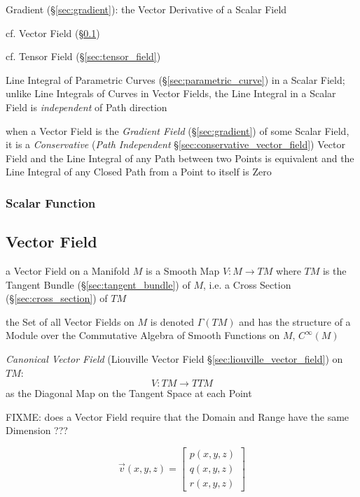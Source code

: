 Gradient (\S\ref{sec:gradient}): the Vector Derivative of a Scalar Field

cf. Vector Field (\S\ref{sec:vector_field})

cf. Tensor Field (\S\ref{sec:tensor_field})

Line Integral of Parametric Curves (\S\ref{sec:parametric_curve}) in a Scalar
Field; unlike Line Integrals of Curves in Vector Fields, the Line Integral in a
Scalar Field is \emph{independent} of Path direction

when a Vector Field is the \emph{Gradient Field} (\S\ref{sec:gradient}) of some
Scalar Field, it is a \emph{Conservative} (\emph{Path Independent}
\S\ref{sec:conservative_vector_field}) Vector Field and the Line Integral of
any Path between two Points is equivalent and the Line Integral of any Closed
Path from a Point to itself is Zero



\subsubsection{Scalar Function}\label{sec:scalar_function}



\subsection{Vector Field}\label{sec:vector_field}

a Vector Field on a Manifold $M$ is a Smooth Map $V : M \rightarrow T M$ where
$TM$ is the Tangent Bundle (\S\ref{sec:tangent_bundle}) of $M$, i.e. a Cross
Section (\S\ref{sec:cross_section}) of $TM$

the Set of all Vector Fields on $M$ is denoted $\Gamma(TM)$ and has the
structure of a Module over the Commutative Algebra of Smooth Functions on $M$,
$C^\infty(M)$

\emph{Canonical Vector Field} (Liouville Vector Field
\S\ref{sec:liouville_vector_field}) on $TM$:
\[
  V : TM \rightarrow TTM
\]
as the Diagonal Map on the Tangent Space at each Point

FIXME: does a Vector Field require that the Domain and Range have the same
Dimension ???

\begin{equation*}
  \vec{v}(x,y,z) = \begin{bmatrix}
    p(x,y,z) \\
    q(x,y,z) \\
    r(x,y,z)
  \end{bmatrix}
\end{equation*}

